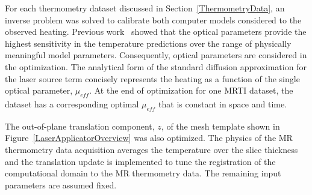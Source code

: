 \documentclass[12pt]{article}
\begin{document}
For each thermometry dataset discussed in Section~\ref{ThermometryData},
an inverse problem was solved to calibrate both computer models considered 
to the observed heating.
Previous work~\cite{fahrenholtz2013generalised} 
showed that the optical parameters provide the highest sensitivity in the temperature
predictions over the range of physically meaningful model parameters.
Consequently, optical parameters are considered in the optimization.
The analytical form of the standard diffusion approximation for
the laser source term concisely represents the heating as a function
of the single optical parameter, $\mu_\textit{eff}$. {\color{red}At the end of
optimization for one MRTI dataset, the dataset has a corresponding
optimal $\mu_\textit{eff}$ that is constant in space and time.}


The out-of-plane translation component, $z$, of the mesh template 
shown in Figure~\ref{LaserApplicatorOverview} was also optimized.
The physics of the MR thermometry data acquisition averages
the temperature over the slice thickness and the translation update
is implemented to tune the registration of the computational domain to the MR thermometry data.
The remaining input parameters are assumed fixed.

\end{document}
